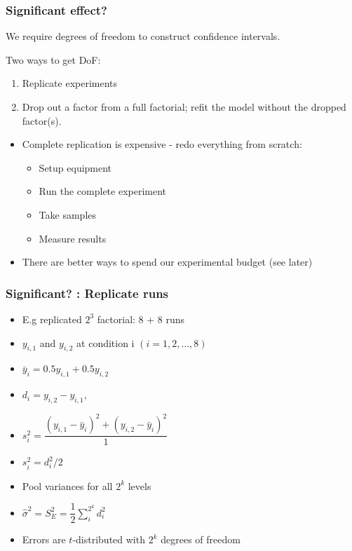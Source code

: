 \begin{frame}\frametitle{Significant effect?}

	We require degrees of freedom to construct confidence intervals.

	Two ways to get DoF:
	\begin{enumerate}
		\item	Replicate experiments
		\item	Drop out a factor from a full factorial; refit the model without the dropped factor(s).
	\end{enumerate}
	\begin{itemize}
		\item	Complete replication is expensive - redo everything from scratch:
		\begin{itemize}
			\item	Setup equipment
			\item	Run the complete experiment
			\item	Take samples
			\item	Measure results
		\end{itemize}
		\item	There are better ways to spend our experimental budget (see later)
	\end{itemize}
\end{frame}

\begin{frame}\frametitle{Significant? : Replicate runs}
	\begin{itemize}
		\item	E.g replicated $2^3$ factorial: 8 + 8 runs
		\item	$y_{i,1}$ and $y_{i,2}$ at condition i $(i=1, 2, \ldots, 8)$
		\item	$\bar{y}_i = 0.5y_{i,1} + 0.5y_{i,2}$
		\item	$d_i = y_{i,2} - y_{i,1}$,
		\item	$s_i^2 = \dfrac{(y_{i,1} - \bar{y}_i)^2 + (y_{i,2} - \bar{y}_i)^2}{1}$
		\item	$s_i^2 = d_i^2/2$
		\item	Pool variances for all $2^k$ levels
		\item	$\hat{\sigma}^2 = S_E^2 = \dfrac{1}{2}\displaystyle\sum_i^{2^k}{d_i^2}$
		\item	Errors are $t$-distributed with $2^k$ degrees of freedom
	\end{itemize}
\end{frame}

